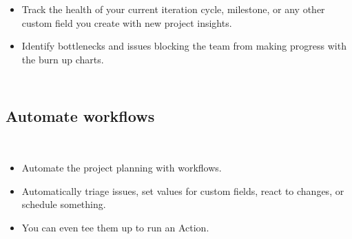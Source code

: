 \begin{frame}
  \frametitle{\insertsectionhead}
  \framesubtitle{\insertsubsectionhead}

  \begin{columns}
    \begin{itemize}
      \item Track the health of your current iteration cycle, milestone, or any other custom field you create with new project insights.
      \item  Identify bottlenecks and issues blocking the team from making progress with the burn up charts.
    \end{itemize}
  \end{columns}


\end{frame}
\subsection*{Automate workflows}
\begin{frame}
  \frametitle{\insertsectionhead}
  \framesubtitle{\insertsubsectionhead}
  \begin{columns}
    \begin{itemize}
      \item  Automate the project planning with workflows. 
      \item Automatically triage issues, set values for custom fields, react to changes, or schedule something. 
      \item You can even tee them up to run an Action.
    \end{itemize}
  \end{columns}

\end{frame}